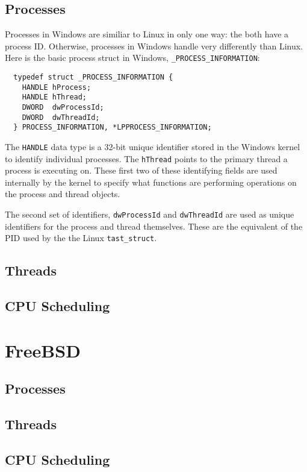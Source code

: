 \documentclass[10pt,letterpaper,onecolumn,draftclsnofoot]{IEEEtran}
\begin{document}
  \subsection{Processes}
Processes in Windows are similiar to Linux in only one way: the both have a
process ID. Otherwise, processes in Windows handle very differently than Linux.
Here is the basic process struct in Windows, \texttt{\_PROCESS\_INFORMATION}:
\cite{msprocstruct2016}

\begin{lstlisting}
  typedef struct _PROCESS_INFORMATION {
    HANDLE hProcess;
    HANDLE hThread;
    DWORD  dwProcessId;
    DWORD  dwThreadId;
  } PROCESS_INFORMATION, *LPPROCESS_INFORMATION;
\end{lstlisting}

The \texttt{HANDLE} data type is a 32-bit unique identifier stored in the Windows
kernel to identify individual processes.\cite{mshandle2016} The \texttt{hThread}
points to the primary thread a process is executing on. These first two of these
identifying fields are used internally by the kernel to specify what functions
are performing operations on the process and thread objects.

The second set of identifiers, \texttt{dwProcessId} and \texttt{dwThreadId} are
used as unique identifiers for the process and thread themselves. These are the
equivalent of the PID used by the the Linux \texttt{tast\_struct}.

  \subsection{Threads}
  \subsection{CPU Scheduling}
\section{FreeBSD}
  \subsection{Processes}
  \subsection{Threads}
  \subsection{CPU Scheduling}
\clearpage
\end{document}
